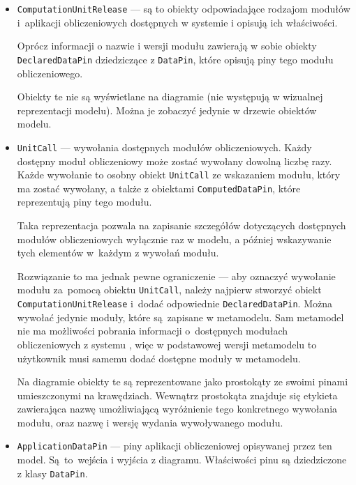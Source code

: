 \begin{itemize}
	\item \texttt{ComputationUnitRelease} --- są to obiekty odpowiadające
	      rodzajom modułów i~aplikacji obliczeniowych dostępnych w systemie \BalticLSC{} i opisują ich właściwości.

	      Oprócz informacji o nazwie i wersji modułu zawierają w sobie obiekty \texttt{DeclaredDataPin} dziedziczące z \texttt{DataPin}, które opisują piny tego modułu obliczeniowego.

	      Obiekty te nie są wyświetlane na diagramie (nie występują w wizualnej reprezentacji modelu). Można je zobaczyć jedynie w drzewie obiektów modelu.


	\item \texttt{UnitCall} --- wywołania dostępnych modułów
	      obliczeniowych. Każdy dostępny moduł obliczeniowy może zostać wywołany dowolną liczbę razy. Każde wywołanie to osobny obiekt \texttt{UnitCall} ze wskazaniem modułu, który ma zostać wywołany, a także z obiektami \texttt{ComputedDataPin}, które reprezentują piny tego modułu.

	      Taka reprezentacja pozwala na zapisanie szczegółów dotyczących dostępnych modułów obliczeniowych wyłącznie raz w modelu, a później wskazywanie tych elementów w~każdym z wywołań modułu.

	      Rozwiązanie to ma jednak pewne ograniczenie --- aby oznaczyć wywołanie modułu za~pomocą obiektu \texttt{UnitCall}, należy najpierw stworzyć obiekt \texttt{Computation\-Unit\-Release} i~dodać odpowiednie \texttt{Declared\-Data\-Pin}. Można wywołać jedynie moduły, które są~zapisane w metamodelu. Sam metamodel nie ma możliwości pobrania informacji o~dostępnych modułach obliczeniowych z systemu \BalticLSC{}, więc w podstawowej wersji metamodelu to użytkownik musi samemu dodać dostępne moduły w metamodelu.

	      Na diagramie obiekty te są reprezentowane jako prostokąty ze swoimi pinami umieszczonymi na krawędziach. Wewnątrz prostokąta znajduje się etykieta zawierająca nazwę umożliwiającą wyróżnienie tego konkretnego wywołania modułu, oraz nazwę i wersję wydania wywoływanego modułu. %

	\item \texttt{ApplicationDataPin} --- piny aplikacji obliczeniowej
	      opisywanej przez ten model. Są~to~wejścia i wyjścia z diagramu. Właściwości pinu są dziedziczone z klasy \texttt{DataPin}.


\end{itemize}
